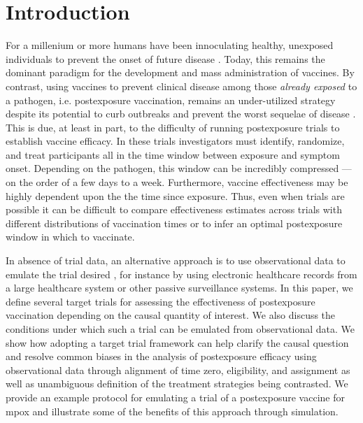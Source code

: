 \documentclass[11pt]{article}
\begin{document}
\section{Introduction} \label{sec:introduction}
For a millenium or more humans have been innoculating healthy, unexposed individuals to prevent the onset of future disease \cite{plotkin2012vaccines}. Today, this remains the dominant paradigm for the development and mass administration of vaccines. By contrast, using vaccines to prevent clinical disease among those \textit{already exposed} to a pathogen, i.e. postexposure vaccination, remains an under-utilized strategy despite its potential to curb outbreaks and prevent the worst sequelae of disease \cite{gallagher_postexposure_2019}. This is due, at least in part, to the difficulty of running postexposure trials to establish vaccine efficacy. In these trials investigators must identify, randomize, and treat participants all in the time window between exposure and symptom onset. Depending on the pathogen, this window can be incredibly compressed ---on the order of a few days to a week. Furthermore, vaccine effectiveness may be highly dependent upon the the time since exposure. Thus, even when trials are possible it can be difficult to compare effectiveness estimates across trials with different distributions of vaccination times or to infer an optimal postexposure window in which to vaccinate. 

In absence of trial data, an alternative approach is to use observational data to emulate the trial desired \cite{hernan_observational_2008,hernan_using_2016}, for instance by using electronic healthcare records from a large healthcare system or other passive surveillance systems. In this paper, we define several target trials for assessing the effectiveness of postexposure vaccination depending on the causal quantity of interest. We also discuss the conditions under which such a trial can be emulated from observational data. We show how adopting a target trial framework can help clarify the causal question and resolve common biases in the analysis of postexposure efficacy using observational data through alignment of time zero, eligibility, and assignment as well as unambiguous definition of the treatment strategies being contrasted. We provide an example protocol for emulating a trial of a postexposure vaccine for mpox and illustrate some of the benefits of this approach through simulation.
\end{document}
